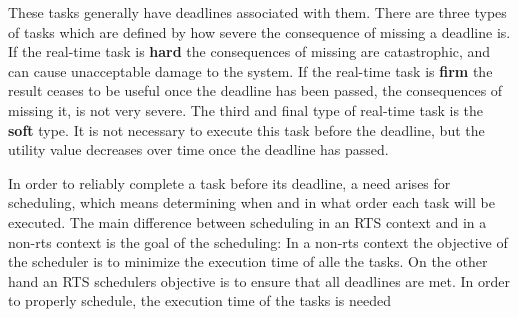 These tasks generally have deadlines associated with them. There are three types
of tasks which are defined by how severe the consequence of missing a
deadline is. If the real-time task is \textbf{hard} the consequences of missing
are catastrophic, and can cause unacceptable damage to the system.
If the real-time task is \textbf{firm} the result ceases to be useful once the
deadline has been passed, the consequences of missing it, is not very severe.
The third and final type of real-time task is the \textbf{soft} type. It
is not necessary to execute this task before the deadline, but the utility
value decreases over time once the deadline has passed\citep[Section 1b]{Realtime}.

In order to reliably complete a task before its deadline, a need arises for scheduling, which means determining when and in what order each task will be executed. The main difference between scheduling in an RTS context and in a non-rts context is the goal of the scheduling: In a non-rts context the objective of the scheduler is to minimize the execution time of alle the tasks. On the other hand an RTS schedulers objective is to ensure that all deadlines are met. In order to properly schedule, the execution time of the tasks is needed


%




